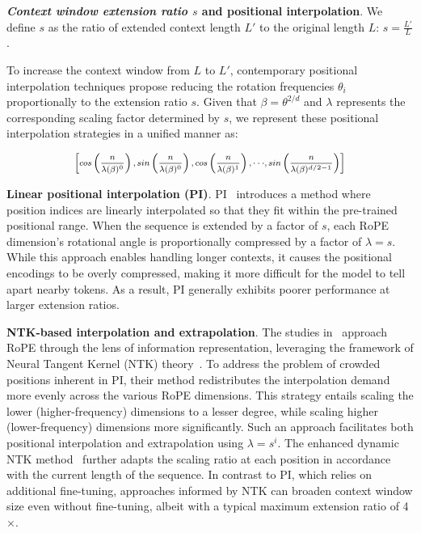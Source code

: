 \textbf{\emph{Context window extension ratio $s$} and positional interpolation}. We define $s$ as  the ratio of extended context length $L'$ to the original length $L$: $s=\frac{L'}{L}$. 

To increase the context window from $L$ to $L'$, contemporary positional interpolation techniques propose reducing the rotation frequencies $\theta_i$ proportionally to the extension ratio $s$. Given that $\beta = \theta^{2/d}$ and $\lambda$ represents the corresponding scaling factor determined by $s$, we represent these positional interpolation strategies in a unified manner as:

\begin{equation}	
	\fontsize{7.5}{7.5} \selectfont
	\label{eq:unified_rope}
	\begin{aligned}
		\left[cos\left(\frac{n}{\lambda(\beta)^0}\right), sin \left(\frac{n}{\lambda(\beta)^0}\right), cos\left(\frac{n}{\lambda(\beta)^1}\right), \cdot\cdot\cdot,  sin \left(\frac{n}{\lambda(\beta)^{d/2-1}}\right) \right]   
	\end{aligned}
\end{equation}

\textbf{Linear positional interpolation (PI)}. PI~\cite{pi} introduces a method where position indices are linearly interpolated so that they fit within the pre-trained positional range. When the sequence is extended by a factor of $s$, each RoPE dimension's rotational angle is proportionally compressed by a factor of $\lambda=s$. While this approach enables handling longer contexts, it causes the positional encodings to be overly compressed, making it more difficult for the model to tell apart nearby tokens. As a result, PI generally exhibits poorer performance at larger extension ratios.

\textbf{NTK-based interpolation and extrapolation}. The studies in~\cite{ntk,dynamicntk} approach RoPE through the lens of information representation, leveraging the framework of Neural Tangent Kernel (NTK) theory~\cite{jacot2018neural,tancik2020fourier}. To address the problem of crowded positions inherent in PI, their method redistributes the interpolation demand more evenly across the various RoPE dimensions. This strategy entails scaling the lower (higher-frequency) dimensions to a lesser degree, while scaling higher (lower-frequency) dimensions more significantly. Such an approach facilitates both positional interpolation and extrapolation using $\lambda=s^{i}$. The enhanced dynamic NTK method~\cite{dynamicntk} further adapts the scaling ratio at each position in accordance with the current length of the sequence. In contrast to PI, which relies on additional fine-tuning, approaches informed by NTK can broaden context window size even without fine-tuning, albeit with a typical maximum extension ratio of 4$\times$.

